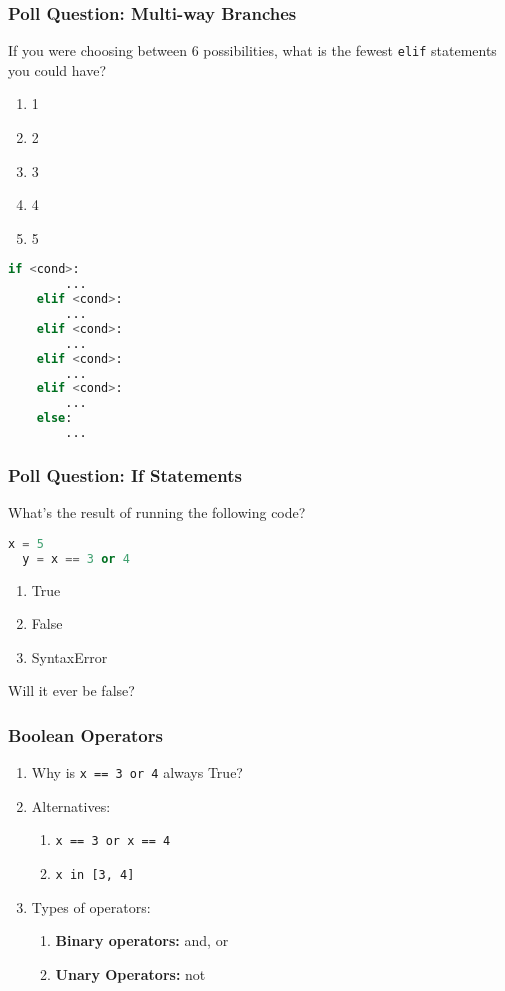 \documentclass{beamer}
\begin{document}
%
%
\begin{frame}[fragile]
	\frametitle{Poll Question: Multi-way Branches}
	If you were choosing between 6 possibilities, what is the fewest \lstinline|elif| statements you could have?
	\vfill
	\begin{minipage}{0.49\textwidth}
		\begin{enumerate}[A]
			\item 1
			\item 2
			\item 3
			\item 4
			\item 5
		\end{enumerate}
	\end{minipage}
	\pause
	\begin{minipage}{0.49\textwidth}
		\begin{lstlisting}[language=Python, autogobble]
	if <cond>:
		...
	elif <cond>:
		...
	elif <cond>:
		...
	elif <cond>:
		...
	elif <cond>:
		...
	else:
		...
		\end{lstlisting}
	\end{minipage}
\end{frame}

%
%
\begin{frame}[fragile]
	\frametitle{Poll Question: If Statements}
	What's the result of running the following code?
	\begin{lstlisting}[language=Python, autogobble]
	x = 5
  y = x == 3 or 4
	\end{lstlisting}
	\vfill
	\begin{enumerate}[A]
		\item True
		\item False
		\item SyntaxError
	\end{enumerate}
	\pause
  Will it ever be false?
\end{frame}

%
%
\begin{frame}[fragile]
	\frametitle{Boolean Operators}
	\begin{enumerate}[A]
		\item Why is \lstinline|x == 3 or 4| always True?
		\item Alternatives:
			\begin{enumerate}
				\item \lstinline|x == 3 or x == 4|
				\item \lstinline|x in [3, 4]|
			\end{enumerate}
		\item Types of operators:
			\begin{enumerate}
				\item \textbf{Binary operators:} and, or
				\item \textbf{Unary Operators: } not
			\end{enumerate}
	\end{enumerate}
\end{frame}
\end{document}

